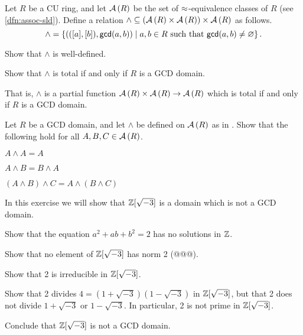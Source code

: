 \begin{exercise} \label{exerc:gcd-meet}
Let \(R\) be a CU ring, and let \( \mathcal{A}\left(R\right) \) be the set of \(\approx\)-equivalence classes of \(R\) (see \ref{dfn:assoc-sld}). Define a relation \(\wedge \subseteq ( \mathcal{A}\left(R\right)  \times  \mathcal{A}\left(R\right) ) \times  \mathcal{A}\left(R\right) \) as follows. \[ \wedge = \left\{ \left(([a],[b]), \mathsf{gcd}(a, b)\right) \mid a,b \in R\ \mathrm{such\ that}\ \mathsf{gcd}(a, b) \neq \varnothing \right\}. \]
\begin{proplist}
\item Show that \(\wedge\) is well-defined.
\item Show that \(\wedge\) is total if and only if \(R\) is a GCD domain.
\end{proplist}
That is, \(\wedge\) is a partial function \( \mathcal{A}\left(R\right)  \times  \mathcal{A}\left(R\right)  \rightarrow  \mathcal{A}\left(R\right) \) which is total if and only if \(R\) is a GCD domain.
\end{exercise}

\begin{exercise}
Let \(R\) be a GCD domain, and let \(\wedge\) be defined on \( \mathcal{A}\left(R\right) \) as in . Show that the following hold for all \(A,B,C \in  \mathcal{A}\left(R\right) \).
\begin{proplist*}
\item \(A \wedge A = A\)
\item \(A \wedge B = B \wedge A\)
\item \((A \wedge B) \wedge C = A \wedge (B \wedge C)\)
\end{proplist*}
\end{exercise}

\begin{exercise} In this exercise we will show that \(\mathbb{Z}[\sqrt{-3}]\) is a domain which is not a GCD domain.
\begin{proplist}
\item Show that the equation \(a^2 + ab + b^2 = 2\) has no solutions in \(\mathbb{Z}\).
\item Show that no element of \(\mathbb{Z}[\sqrt{-3}]\) has norm 2 (@@@).
\item Show that 2 is irreducible in \(\mathbb{Z}[\sqrt{-3}]\).
\item Show that 2 divides \(4 = (1 + \sqrt{-3})(1 - \sqrt{-3})\) in \(\mathbb{Z}[\sqrt{-3}]\), but that 2 does not divide \(1 + \sqrt{-3}\) or \(1 - \sqrt{-3}\). In particular, 2 is not prime in \(\mathbb{Z}[\sqrt{-3}]\).
\item Conclude that \(\mathbb{Z}[\sqrt{-3}]\) is not a GCD domain.
\end{proplist}
\end{exercise}

